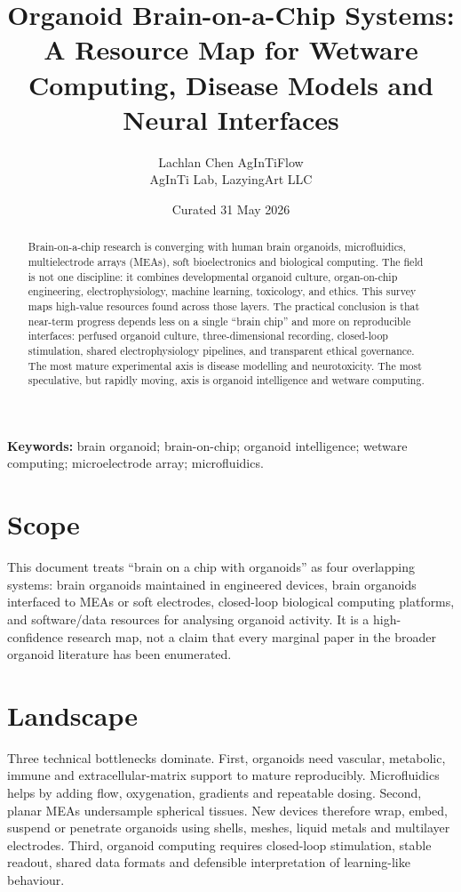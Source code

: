 \documentclass[10pt,twocolumn]{article}
\title{\vspace{-1.5em}\bfseries Organoid Brain-on-a-Chip Systems: A Resource Map for Wetware Computing, Disease Models and Neural Interfaces}
\author{\begin{tabular}{c}Lachlan Chen \quad AgInTiFlow\\AgInTi Lab, LazyingArt LLC\end{tabular}}
\date{Curated 31 May 2026}
\begin{document}
\maketitle

\begin{abstract}
\noindent Brain-on-a-chip research is converging with human brain organoids, microfluidics, multielectrode arrays (MEAs), soft bioelectronics and biological computing. The field is not one discipline: it combines developmental organoid culture, organ-on-chip engineering, electrophysiology, machine learning, toxicology, and ethics. This survey maps high-value resources found across those layers. The practical conclusion is that near-term progress depends less on a single ``brain chip'' and more on reproducible interfaces: perfused organoid culture, three-dimensional recording, closed-loop stimulation, shared electrophysiology pipelines, and transparent ethical governance. The most mature experimental axis is disease modelling and neurotoxicity. The most speculative, but rapidly moving, axis is organoid intelligence and wetware computing.
\end{abstract}

\textbf{Keywords:} brain organoid; brain-on-chip; organoid intelligence; wetware computing; microelectrode array; microfluidics.

\section{Scope}

This document treats ``brain on a chip with organoids'' as four overlapping systems: brain organoids maintained in engineered devices, brain organoids interfaced to MEAs or soft electrodes, closed-loop biological computing platforms, and software/data resources for analysing organoid activity. It is a high-confidence research map, not a claim that every marginal paper in the broader organoid literature has been enumerated.

\section{Landscape}

Three technical bottlenecks dominate. First, organoids need vascular, metabolic, immune and extracellular-matrix support to mature reproducibly. Microfluidics helps by adding flow, oxygenation, gradients and repeatable dosing. Second, planar MEAs undersample spherical tissues. New devices therefore wrap, embed, suspend or penetrate organoids using shells, meshes, liquid metals and multilayer electrodes. Third, organoid computing requires closed-loop stimulation, stable readout, shared data formats and defensible interpretation of learning-like behaviour.
\end{document}
